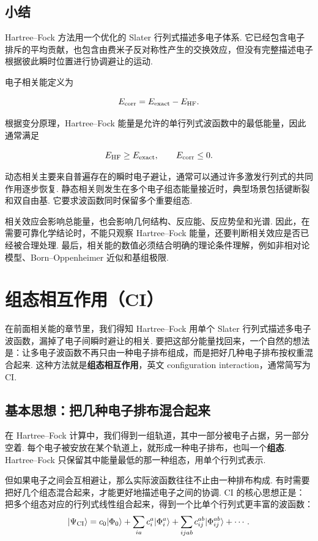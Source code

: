 \documentclass[UTF8,11pt,a4paper,openany]{ctexbook}
\newcommand{\ket}[1]{\lvert #1\rangle}\newcommand{\bra}[1]{\langle #1\rvert}
\newcommand{\term}[1]{\textbf{#1}}
\begin{document}
\section{小结}

Hartree--Fock 方法用一个优化的 Slater 行列式描述多电子体系. 它已经包含电子排斥的平均贡献，也包含由费米子反对称性产生的交换效应，但没有完整描述电子根据彼此瞬时位置进行协调避让的运动. 

电子相关能定义为

\[
E_{\rm corr}=E_{\rm exact}-E_{\rm HF}.
\]

根据变分原理，Hartree--Fock 能量是允许的单行列式波函数中的最低能量，因此通常满足

\[
E_{\rm HF}\geq E_{\rm exact},
\qquad
E_{\rm corr}\leq 0.
\]

动态相关主要来自普遍存在的瞬时电子避让，通常可以通过许多激发行列式的共同作用逐步恢复. 静态相关则发生在多个电子组态能量接近时，典型场景包括键断裂和双自由基. 它要求波函数同时保留多个重要组态. 

相关效应会影响总能量，也会影响几何结构、反应能、反应势垒和光谱. 因此，在需要可靠化学结论时，不能只观察 Hartree--Fock 能量，还要判断相关效应是否已经被合理处理. 最后，相关能的数值必须结合明确的理论条件理解，例如非相对论模型、Born--Oppenheimer 近似和基组极限. 
\chapter{组态相互作用（CI）}

在前面相关能的章节里，我们得知 Hartree--Fock 用单个 Slater 行列式描述多电子波函数，漏掉了电子间瞬时避让的相关. 要把这部分能量找回来，一个自然的想法是：让多电子波函数不再只由一种电子排布组成，而是把好几种电子排布按权重混合起来. 这种方法就是\term{组态相互作用}，英文 configuration interaction，通常简写为 CI. 

\section{基本思想：把几种电子排布混合起来}

在 Hartree--Fock 计算中，我们得到一组轨道，其中一部分被电子占据，另一部分空着. 每个电子被安放在某个轨道上，就形成一种电子排布，也叫一个\term{组态}. Hartree--Fock 只保留其中能量最低的那一种组态，用单个行列式表示. 

但如果电子之间会互相避让，那么实际波函数往往不止由一种排布构成. 有时需要把好几个组态混合起来，才能更好地描述电子之间的协调. CI 的核心思想正是：把多个组态对应的行列式线性组合起来，得到一个比单个行列式更丰富的波函数：
\[
\ket{\Psi_{\rm CI}}
=
c_0\ket{\Phi_0}
+
\sum_{ia}c_i^a\ket{\Phi_i^a}
+
\sum_{ijab}c_{ij}^{ab}\ket{\Phi_{ij}^{ab}}
+\cdots.
\]
\end{document}
